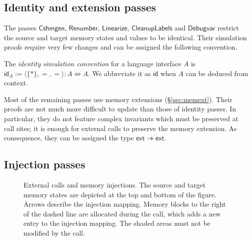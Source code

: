 \documentclass[acmsmall,authordraft]{acmart}
\newcommand{\kw}[1]{\ensuremath{ \mathsf{#1} }}
\begin{document}
\subsection{Identity and extension passes} \label{sec:pass:id} %

The passes \kw{Cshmgen}, \kw{Renumber}, \kw{Linearize},
\kw{CleanupLabels} and \kw{Debugvar}
restrict the source and target
memory states and values to be identical.
Their simulation proofs require very few changes
and can be assigned the following convention.

\begin{definition} %
The \emph{identity simulation convention} for
a language interface $A$ is
$\kw{id}_A := \langle \{*\}, {=}, {=} \rangle : A \Leftrightarrow A$.
We abbreviate it as $\kw{id}$ when $A$ can be deduced
from context.
\end{definition}

Most of the remaining passes use memory extensions
(\S\ref{sec:memext}).
Their proofs are not much more difficult to update
than those of identity passes.
In particular,
they do not feature complex invariants
which must be preserved at call sites;
it is enough for external calls to preserve
the memory extension.
As consequence,
they can be assigned the type $\kw{ext} \twoheadrightarrow \kw{ext}$.


\subsection{Injection passes} \label{sec:pass:inj} %

\begin{figure} %
  \caption{External calls and memory injections.
    The source and target memory states are
    depicted at the top and bottom
    of the figure. Arrows describe the injection mapping.
    Memory blocks to the right of the dashed line
    are allocated during the call,
    which adds a new entry to the injection mapping.
    The shaded areas must not be modified by the call.
  }
  \label{fig:injp}
\end{figure}
\end{document}
